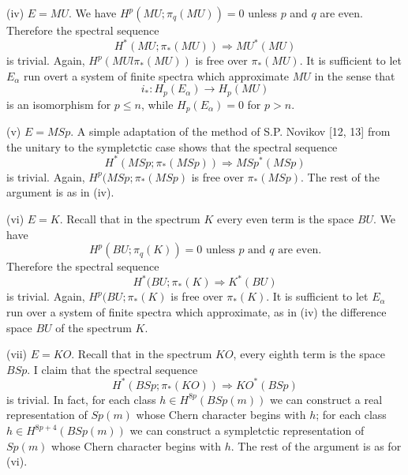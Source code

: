 \documentclass[../main]{subfiles}
\begin{document}
(iv) $E = MU$. We have $H^p(MU;\pi_q(MU)) = 0$ unless $p$ and $q$ are even. Therefore the spectral sequence
\[H^{\ast}(MU;\pi_\ast(MU)) \Longrightarrow MU^\ast(MU)\]
is trivial. Again, $H^p(MUl\pi_\ast(MU))$ is free over $\pi_\ast(MU)$. It is sufficient to let $E_\alpha$ run overt a system of finite spectra which approximate $MU$ in the sense that
\[i_\ast \colon H_p(E_\alpha) \longrightarrow H_p(MU)\]
is an isomorphism for $p\leq n$, while $H_p(E_\alpha) = 0$ for $p > n$.

(v) $E=MSp$. A simple adaptation of the method of S.P. Novikov [12, 13] from the unitary to the sympletctic case shows that the spectral sequence
\[H^{\ast}(MSp;\pi_{\ast}(MSp)) \Longrightarrow MSp^\ast(MSp)\]
is trivial. Again, $H^p(MSp;\pi_\ast(MSp)$ is free over $\pi_\ast(MSp)$. The rest of the argument is as in (iv).

(vi) $E=K$. Recall that in the spectrum $K$ every even term is the space $BU$. We have
\[H^p(BU;\pi_{q}(K)) = 0 \text{ unless } p \text{ and } q \text{ are even.}\]
Therefore the spectral sequence
\[H^{\ast}(BU;\pi_{\ast}(K) \Longrightarrow K^\ast(BU)\]
is trivial. Again, $H^p(BU;\pi_\ast(K)$ is free over $\pi_\ast(K)$. It is sufficient to let $E_\alpha$ run over a system of finite spectra which approximate, as in (iv) the difference space $BU$ of the spectrum $K$.

(vii) $E = KO$. Recall that in the spectrum $KO$, every eighth term is the space $BSp$. I claim that the spectral sequence
\[H^{\ast}(BSp;\pi_\ast(KO)) \Longrightarrow KO^\ast(BSp)\]
is trivial. In fact, for each class $h \in H^{8p}(BSp(m))$ we can construct a real representation of $Sp(m)$ whose Chern character begins with $h$; for each class $h \in H^{8p+4}(BSp(m))$ we can construct a sympletctic representation of $Sp(m)$ whose Chern character begins with $h$. The rest of the argument is as for (vi).
\end{document}

